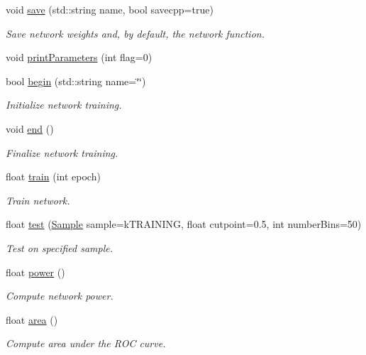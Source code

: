 \begin{CompactItemize}
void \hyperlink{classjetnet_1_1NN_a19}{save} (std::string name, bool savecpp=true)
\begin{CompactList}\small\item\em Save network weights and, by default, the network function. \item\end{CompactList}\item 
void \hyperlink{classjetnet_1_1NN_a20}{print\-Parameters} (int flag=0)
\item 
bool \hyperlink{classjetnet_1_1NN_a21}{begin} (std::string name=\char`\"{}\char`\"{})
\begin{CompactList}\small\item\em Initialize network training. \item\end{CompactList}\item 
void \hyperlink{classjetnet_1_1NN_a22}{end} ()
\begin{CompactList}\small\item\em Finalize network training. \item\end{CompactList}\item 
float \hyperlink{classjetnet_1_1NN_a23}{train} (int epoch)
\begin{CompactList}\small\item\em Train network. \item\end{CompactList}\item 
float \hyperlink{classjetnet_1_1NN_a24}{test} (\hyperlink{classjetnet_1_1NN_w17}{Sample} sample=k\-TRAINING, float cutpoint=0.5, int number\-Bins=50)
\begin{CompactList}\small\item\em Test on specified sample. \item\end{CompactList}\item 
float \hyperlink{classjetnet_1_1NN_a25}{power} ()
\begin{CompactList}\small\item\em Compute network power. \item\end{CompactList}\item 
float \hyperlink{classjetnet_1_1NN_a26}{area} ()
\begin{CompactList}\small\item\em Compute area under the ROC curve. \item\end{CompactList}\item 

\end{CompactItemize}
